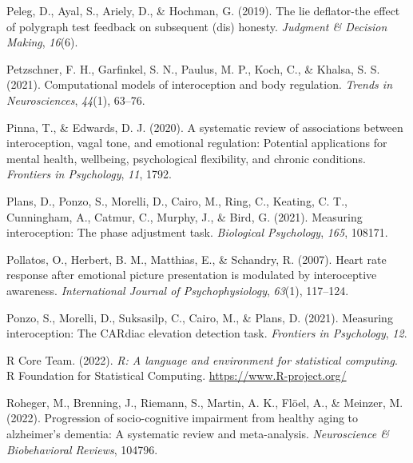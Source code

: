 \documentclass[
  man,mask,floatsintext]{apa6}
\newlength{\cslhangindent}
\newlength{\cslentryspacingunit} %
\newenvironment{CSLReferences}[2] %
 {%
  \setlength{\parindent}{0pt}
  \ifodd #1
  \let\oldpar\par
  \def\par{\hangindent=\cslhangindent\oldpar}
  \fi
  \setlength{\parskip}{#2\cslentryspacingunit}
 }%
 {}
\begin{document}
\begin{CSLReferences}{1}{0}
\leavevmode{}%
Peleg, D., Ayal, S., Ariely, D., \& Hochman, G. (2019). The lie deflator-the effect of polygraph test feedback on subsequent (dis) honesty. \emph{Judgment \& Decision Making}, \emph{16}(6).

\leavevmode{}%
Petzschner, F. H., Garfinkel, S. N., Paulus, M. P., Koch, C., \& Khalsa, S. S. (2021). Computational models of interoception and body regulation. \emph{Trends in Neurosciences}, \emph{44}(1), 63--76.

\leavevmode{}%
Pinna, T., \& Edwards, D. J. (2020). A systematic review of associations between interoception, vagal tone, and emotional regulation: Potential applications for mental health, wellbeing, psychological flexibility, and chronic conditions. \emph{Frontiers in Psychology}, \emph{11}, 1792.

\leavevmode{}%
Plans, D., Ponzo, S., Morelli, D., Cairo, M., Ring, C., Keating, C. T., Cunningham, A., Catmur, C., Murphy, J., \& Bird, G. (2021). Measuring interoception: The phase adjustment task. \emph{Biological Psychology}, \emph{165}, 108171.

\leavevmode{}%
Pollatos, O., Herbert, B. M., Matthias, E., \& Schandry, R. (2007). Heart rate response after emotional picture presentation is modulated by interoceptive awareness. \emph{International Journal of Psychophysiology}, \emph{63}(1), 117--124.

\leavevmode{}%
Ponzo, S., Morelli, D., Suksasilp, C., Cairo, M., \& Plans, D. (2021). Measuring interoception: The CARdiac elevation detection task. \emph{Frontiers in Psychology}, \emph{12}.

\leavevmode{}%
R Core Team. (2022). \emph{R: A language and environment for statistical computing}. R Foundation for Statistical Computing. \url{https://www.R-project.org/}

\leavevmode{}%
Roheger, M., Brenning, J., Riemann, S., Martin, A. K., Flöel, A., \& Meinzer, M. (2022). Progression of socio-cognitive impairment from healthy aging to alzheimer's dementia: A systematic review and meta-analysis. \emph{Neuroscience \& Biobehavioral Reviews}, 104796.


\end{CSLReferences}
\end{document}
